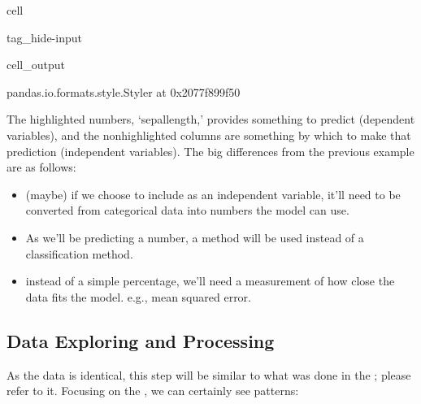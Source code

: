 \documentclass[letterpaper,10pt,english]{jupyterBook}
\begin{document}
\begin{sphinxuseclass}{cell}
\begin{sphinxuseclass}{tag_hide-input}\begin{sphinxVerbatimOutput}

\begin{sphinxuseclass}{cell_output}
\begin{sphinxVerbatim}[commandchars=\\\{\}]
\PYGZlt{}pandas.io.formats.style.Styler at 0x2077f899f50\PYGZgt{}
\end{sphinxVerbatim}

\end{sphinxuseclass}\end{sphinxVerbatimOutput}

\end{sphinxuseclass}
\end{sphinxuseclass}
\sphinxAtStartPar
The highlighted numbers, ‘sepal\sphinxhyphen{}length,’ provides something to predict (dependent variables), and the non\sphinxhyphen{}highlighted columns are something by which to make that prediction (independent variables). The big differences from the previous example are as follows:
\begin{itemize}
\item {} 
\sphinxAtStartPar
{} (maybe) if we choose to include  as an independent variable, it’ll need to be converted from categorical data into numbers the model can use.

\item {} 
\sphinxAtStartPar
{} As we’ll be predicting a number, a  method will be used instead of a classification method.

\item {} 
\sphinxAtStartPar
{} instead of a simple percentage, we’ll need a measurement of how close the data fits the model. e.g., mean squared error.

\end{itemize}


\subsection{Data Exploring and Processing}
\label{\detokenize{task2_c/example_sup_reg/sup_reg_ex:data-exploring-and-processing}}
\sphinxAtStartPar
As the data is identical, this step will be similar to what was done in the {\hyperref[\detokenize{task2_c/example_sup_class/sup_class_ex-process:sup-class-ex-data}]{}}; please refer to it. Focusing on the , we can certainly see patterns:
\end{document}
